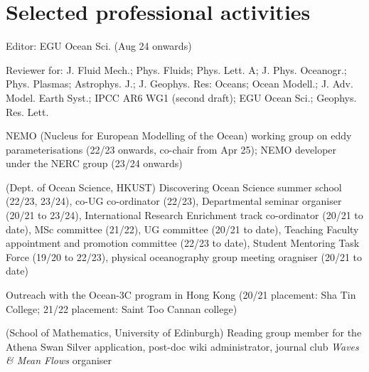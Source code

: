 \documentclass[letterpaper]{article}
\renewenvironment{itemize}{
  \begin{list}{}{
    \setlength{\leftmargin}{1.5em}
  }
}{
  \end{list}
}
\begin{document}
\section*{Selected professional activities}
\begin{itemize}

\item[--] Editor: EGU Ocean Sci. (Aug 24 onwards)

\item[--] Reviewer for: J. Fluid Mech.; Phys. Fluids; Phys. Lett. A; J. Phys. Oceanogr.; Phys. Plasmas; Astrophys. J.; J. Geophys. Res: Oceans; Ocean Modell.; J. Adv. Model. Earth Syst.; IPCC AR6 WG1 (second draft); EGU Ocean Sci.; Geophys. Res. Lett.

\item[--] NEMO (Nucleus for European Modelling of the Ocean) working group on eddy parameterisations (22/23 onwards, co-chair from Apr 25); NEMO developer under the NERC group (23/24 onwards)

\item[--] (Dept. of Ocean Science, HKUST) Discovering Ocean Science summer school (22/23, 23/24), co-UG co-ordinator (22/23), Departmental seminar organiser (20/21 to 23/24), International Research Enrichment track co-ordinator (20/21 to date), MSc committee (21/22), UG committee (20/21 to date), Teaching Faculty appointment and promotion committee (22/23 to date), Student Mentoring Task Force (19/20 to 22/23), physical oceanography group meeting oragniser (20/21 to date)

\item[--] Outreach with the Ocean-3C program in Hong Kong (20/21 placement: Sha Tin College; 21/22 placement: Saint Too Cannan college)

\item[--] (School of Mathematics, University of Edinburgh) Reading group member for the Athena Swan Silver application, post-doc wiki administrator, journal club \textit{Waves \& Mean Flows} organiser 

\end{itemize}

\end{document}
